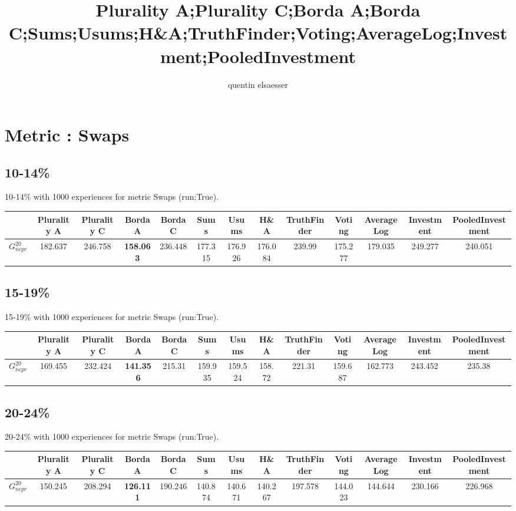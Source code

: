 \documentclass{article}
\author{quentin elsaesser}
\title{Plurality A;Plurality C;Borda A;Borda C;Sums;Usums;H\&A;TruthFinder;Voting;AverageLog;Investment;PooledInvestment}
\newcommand{\graph}[2]{$G_{#1}^{#2}$}
\begin{document}
\newpage

\newpage
\section{Metric : Swaps}

\newpage

\subsection{10-14\%}

10-14\% with 1000 experiences for metric Swaps (run:True).

\noindent\begin{tabular}{|l|c|c|c|c|c|c|c|c|c|c|c|c|}
\hline
& Plurality A& Plurality C& Borda A& Borda C& Sums& Usums& H\&A& TruthFinder& Voting& AverageLog& Investment& PooledInvestment\\
\hline
\graph{ncpr}{20} &182.637&246.758&\textbf{158.063}&236.448&177.315&176.926&176.084&239.99&175.277&179.035&249.277&240.051\\
\hline
\end{tabular}
\newpage

\subsection{15-19\%}

15-19\% with 1000 experiences for metric Swaps (run:True).

\noindent\begin{tabular}{|l|c|c|c|c|c|c|c|c|c|c|c|c|}
\hline
& Plurality A& Plurality C& Borda A& Borda C& Sums& Usums& H\&A& TruthFinder& Voting& AverageLog& Investment& PooledInvestment\\
\hline
\graph{ncpr}{20} &169.455&232.424&\textbf{141.356}&215.31&159.935&159.524&158.72&221.31&159.687&162.773&243.452&235.38\\
\hline
\end{tabular}
\newpage

\subsection{20-24\%}

20-24\% with 1000 experiences for metric Swaps (run:True).

\noindent\begin{tabular}{|l|c|c|c|c|c|c|c|c|c|c|c|c|}
\hline
& Plurality A& Plurality C& Borda A& Borda C& Sums& Usums& H\&A& TruthFinder& Voting& AverageLog& Investment& PooledInvestment\\
\hline
\graph{ncpr}{20} &150.245&208.294&\textbf{126.111}&190.246&140.874&140.671&140.267&197.578&144.023&144.644&230.166&226.968\\
\hline
\end{tabular}
\newpage
\end{document}
